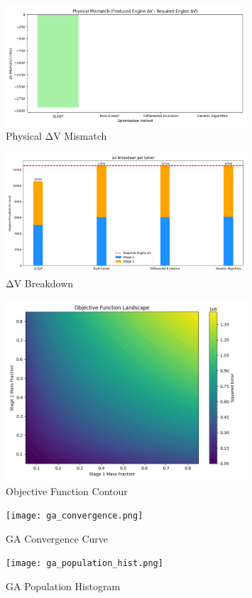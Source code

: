 \documentclass{article}
\begin{document}
\begin{figure}[ht]
\centering
\includegraphics[width=0.8\textwidth]{physical_mismatch.png}
\caption{Physical ΔV Mismatch}
\end{figure}

\begin{figure}[ht]
\centering
\includegraphics[width=0.8\textwidth]{dv_breakdown.png}
\caption{ΔV Breakdown}
\end{figure}

\begin{figure}[ht]
\centering
\includegraphics[width=0.8\textwidth]{objective_contour.png}
\caption{Objective Function Contour}
\end{figure}

\begin{figure}[ht]
\centering
\texttt{[image: ga\_convergence.png]}
\caption{GA Convergence Curve}
\end{figure}

\begin{figure}[ht]
\centering
\texttt{[image: ga\_population\_hist.png]}
\caption{GA Population Histogram}
\end{figure}
\end{document}
